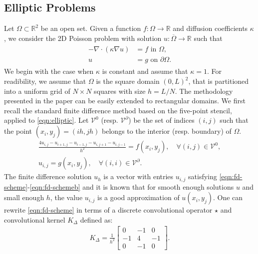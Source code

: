 \documentclass[preprint,12pt]{elsarticle}
\begin{document}
\subsection{Elliptic Problems}
Let $\Omega \subset \mathbb{R}^2$ be an open set. Given a function $f:\Omega \rightarrow \mathbb{R}$ and diffusion coefficients $\kappa$, we consider the 2D Poisson problem with solution $u: \overline{\Omega} \rightarrow \mathbb{R}$ such that
\begin{align} \label{eqn:elliptic}
    \begin{split}
    -\nabla \cdot (\kappa \nabla u) &= f \text{ in } \Omega, \\
    u &= g \text{ on } \partial \Omega.
    \end{split}
\end{align}
We begin with the case when $\kappa$ is constant and assume that $\kappa = 1$. For readibility, we assume that $\Omega$ is the square domain $(0,L)^2$, that is partitioned into a uniform grid of $N\times N$ squares with size $h=L/N$. The methodology presented in the paper can be easily extended to rectangular domains.  We first recall the standard finite difference method based on the five-point stencil, applied to \eqref{eqn:elliptic}. Let $\mathcal{V}^0$ (resp. $\mathcal{V}^\partial$) be the set of indices $(i,j)$ such that the point $(x_i,y_j) = (i h, j h)$ belongs to the interior (resp. boundary) of $\Omega$.  
\begin{align} \label{eqn:fd-scheme}
    \frac{4u_{i,j} - u_{i+1, j} - u_{i-1, j} - u_{i, j+1} - u_{i, j-1}}{h^2} = f(x_i,y_j), \quad \forall (i,j) \in \mathcal{V}^0, \\
    u_{i,j} = g(x_i,y_j), \quad \forall (i,i)\in\mathcal{V}^\partial. \label{eqn:fd-schemeb}
\end{align}
The finite difference solution $u_h$ is a vector with entries $u_{i,j}$ satisfying \eqref{eqn:fd-scheme}-\eqref{eqn:fd-schemeb} and it is known that for smooth enough solutions $u$ and small enough $h$, the value $u_{i,j}$ is a good approximation of $u(x_i,y_j)$. One can rewrite \eqref{eqn:fd-scheme} in terms of a discrete convolutional operator $\star$ and convolutional kernel $K_\Delta$ defined as:
\begin{gather}
    K_{\Delta} = \frac{1}{h^2}\begin{bmatrix} 0 & -1 & 0 \\ -1 & 4 & -1 \\ 0 & -1 & 0\end{bmatrix}.
\end{gather}
\end{document}
